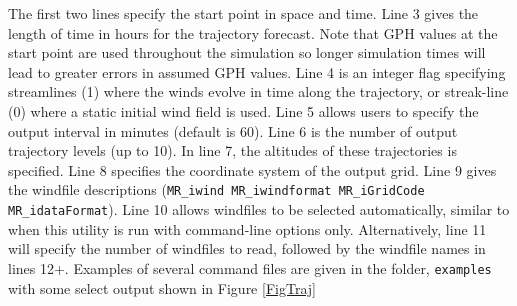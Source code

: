 \documentclass[11pt]{article}   %
\begin{document}
The first two lines specify the start point in space and time.  Line 3 gives the length of time
in hours for the trajectory forecast.  Note that GPH values at the start point are
used throughout the simulation so longer simulation times will lead to greater errors in
assumed GPH values.  Line 4 is an integer flag specifying streamlines (1) where the winds
evolve in time along the trajectory, or streak-line (0) where a static initial wind
field is used.
Line 5 allows users to specify the output interval in minutes (default is 60).  Line 6
is the number of output trajectory levels (up to 10).  In line 7, the altitudes of
these trajectories is specified.
Line 8 specifies the coordinate system of the output grid.
Line 9 gives the windfile descriptions
(\texttt{MR\_iwind MR\_iwindformat MR\_iGridCode MR\_idataFormat}).
Line 10 allows windfiles to be selected automatically, similar to when this utility
is run with command-line options only.  Alternatively, line 11 will specify the number
of windfiles to read, followed by the windfile names in lines 12+.
Examples of several command files are given in the folder, \texttt{examples} with some
select output shown in Figure \ref{FigTraj}
\end{document}
